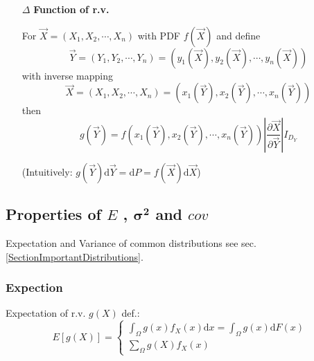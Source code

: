     \begin{itemize}
        \item[$\Delta$] \textbf{Function of r.v.}
        
        For $\vec{X}=(X_1,X_2,\cdots,X_n)$ with PDF $f(\vec{X})$ and define 
        \begin{equation}    
            \vec{Y}=(Y_1,Y_2,\cdots,Y_n)=(y_1(\vec{X}),y_2(\vec{X}),\cdots,y_n(\vec{X}))
        \end{equation}
        with inverse mapping
        \begin{equation}    
            \vec{X}=(X_1,X_2,\cdots,X_n)=(x_1(\vec{Y}),x_2(\vec{Y}),\cdots,x_n(\vec{Y}))
        \end{equation}
        then
        \begin{equation}    
            g(\vec{Y})= f(x_1(\vec{Y}),x_2(\vec{Y}),\cdots,x_n(\vec{Y}))\left|\frac{\partial \vec{X}}{\partial\vec{Y}}\right|I_{D_Y}
        \end{equation}

        (Intuitively: $g(\vec{Y})\mathrm{d}\vec{Y}=\mathrm{d}P=f(\vec{X})\mathrm{d}\vec{X}$)
    \end{itemize}




\subsection{Properties of $E$ , $\mathbf{\sigma^2}$ and $cov$}

    Expectation and Variance of common distributions see sec.\ref{SectionImportantDistributions}.

\subsubsection{Expection}
    Expectation of r.v. $g(X)$ def.:
    \begin{equation}
    E[g(X)]=\begin{cases}
        {\displaystyle\int_\Omega g(x) f_X(x)\mathrm{d}x=\int_\Omega g(x)\mathrm{d}F(x)}\\
        {\displaystyle\sum_{\Omega}g(X)f_X(x)}
    \end{cases}
\end{equation}

